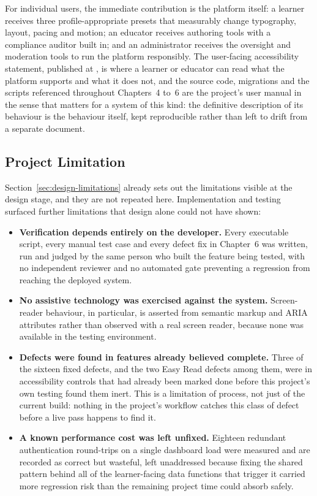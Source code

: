 \documentclass[12pt, oneside]{article} %
\newcommand{\tcode}[1]{\path{#1}}
\begin{document}
For individual users, the immediate contribution is the platform itself: a learner receives three profile-appropriate presets that measurably change typography, layout, pacing and motion; an educator receives authoring tools with a compliance auditor built in; and an administrator receives the oversight and moderation tools to run the platform responsibly. The user-facing accessibility statement, published at \tcode{/accessibility-statement}, is where a learner or educator can read what the platform supports and what it does not, and the source code, migrations and the scripts referenced throughout Chapters~4 to~6 are the project's user manual in the sense that matters for a system of this kind: the definitive description of its behaviour is the behaviour itself, kept reproducible rather than left to drift from a separate document.

\subsection{Project Limitation}

Section~\ref{sec:design-limitations} already sets out the limitations visible at the design stage, and they are not repeated here. Implementation and testing surfaced further limitations that design alone could not have shown:

\begin{itemize}
    \item \textbf{Verification depends entirely on the developer.} Every executable script, every manual test case and every defect fix in Chapter~6 was written, run and judged by the same person who built the feature being tested, with no independent reviewer and no automated gate preventing a regression from reaching the deployed system.
    \item \textbf{No assistive technology was exercised against the system.} Screen-reader behaviour, in particular, is asserted from semantic markup and ARIA attributes rather than observed with a real screen reader, because none was available in the testing environment.
    \item \textbf{Defects were found in features already believed complete.} Three of the sixteen fixed defects, and the two Easy Read defects among them, were in accessibility controls that had already been marked done before this project's own testing found them inert. This is a limitation of process, not just of the current build: nothing in the project's workflow catches this class of defect before a live pass happens to find it.
    \item \textbf{A known performance cost was left unfixed.} Eighteen redundant authentication round-trips on a single dashboard load were measured and are recorded as correct but wasteful, left unaddressed because fixing the shared pattern behind all of the learner-facing data functions that trigger it carried more regression risk than the remaining project time could absorb safely.
\end{itemize}
\end{document}
